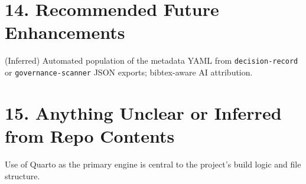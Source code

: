 \documentclass[
]{report}
\begin{document}
\section{14. Recommended Future
Enhancements}\label{recommended-future-enhancements}

(Inferred) Automated population of the metadata YAML from
\texttt{decision-record} or \texttt{governance-scanner} JSON exports;
bibtex-aware AI attribution.

\section{15. Anything Unclear or Inferred from Repo
Contents}\label{anything-unclear-or-inferred-from-repo-contents}

Use of Quarto as the primary engine is central to the project's build
logic and file structure.
\end{document}
